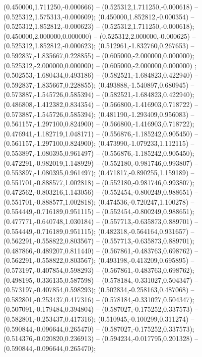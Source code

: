  (0.450000,1.711250,-0.000666) -- (0.525312,1.711250,-0.000618) -- (0.525312,1.575313,-0.000609);
 (0.450000,1.852812,-0.000354) -- (0.525312,1.852812,-0.000623) -- (0.525312,1.711250,-0.000618);
 (0.450000,2.000000,0.000000) -- (0.525312,2.000000,-0.000625) -- (0.525312,1.852812,-0.000623);
 (0.512961,-1.832760,0.267653) -- (0.592837,-1.835667,0.228855) -- (0.605000,-2.000000,0.000000);
 (0.525312,-2.000000,0.000000) -- (0.605000,-2.000000,0.000000) ;
 (0.502553,-1.680434,0.493186) -- (0.582521,-1.684823,0.422940) -- (0.592837,-1.835667,0.228855);
 (0.493888,-1.540897,0.680945) -- (0.573887,-1.545726,0.585394) -- (0.582521,-1.684823,0.422940);
 (0.486808,-1.412382,0.834354) -- (0.566800,-1.416903,0.718722) -- (0.573887,-1.545726,0.585394);
 (0.481190,-1.293409,0.956083) -- (0.561157,-1.297100,0.824900) -- (0.566800,-1.416903,0.718722);
 (0.476941,-1.182719,1.048171) -- (0.556876,-1.185242,0.905450) -- (0.561157,-1.297100,0.824900);
 (0.473990,-1.079233,1.112115) -- (0.553897,-1.080395,0.961497) -- (0.556876,-1.185242,0.905450);
 (0.472291,-0.982019,1.148929) -- (0.552180,-0.981746,0.993807) -- (0.553897,-1.080395,0.961497);
 (0.471817,-0.890255,1.159189) -- (0.551701,-0.888577,1.002818) -- (0.552180,-0.981746,0.993807);
 (0.472562,-0.803216,1.143056) -- (0.552454,-0.800249,0.988651) -- (0.551701,-0.888577,1.002818);
 (0.474536,-0.720247,1.100278) -- (0.554449,-0.716189,0.951115) -- (0.552454,-0.800249,0.988651);
 (0.477771,-0.640748,1.030184) -- (0.557713,-0.635873,0.889701) -- (0.554449,-0.716189,0.951115);
 (0.482318,-0.564164,0.931657) -- (0.562291,-0.558822,0.803567) -- (0.557713,-0.635873,0.889701);
 (0.487866,-0.489207,0.811440) -- (0.567861,-0.483763,0.698762) -- (0.562291,-0.558822,0.803567);
 (0.493198,-0.413209,0.695895) -- (0.573197,-0.407854,0.598293) -- (0.567861,-0.483763,0.698762);
 (0.498195,-0.336135,0.587598) -- (0.578184,-0.331027,0.504347) -- (0.573197,-0.407854,0.598293);
 (0.502834,-0.258163,0.487068) -- (0.582801,-0.253437,0.417316) -- (0.578184,-0.331027,0.504347);
 (0.507091,-0.179484,0.394804) -- (0.587027,-0.175252,0.337573) -- (0.582801,-0.253437,0.417316);
 (0.510945,-0.100299,0.311274) -- (0.590844,-0.096644,0.265470) -- (0.587027,-0.175252,0.337573);
 (0.514376,-0.020820,0.236913) -- (0.594234,-0.017795,0.201328) -- (0.590844,-0.096644,0.265470);
